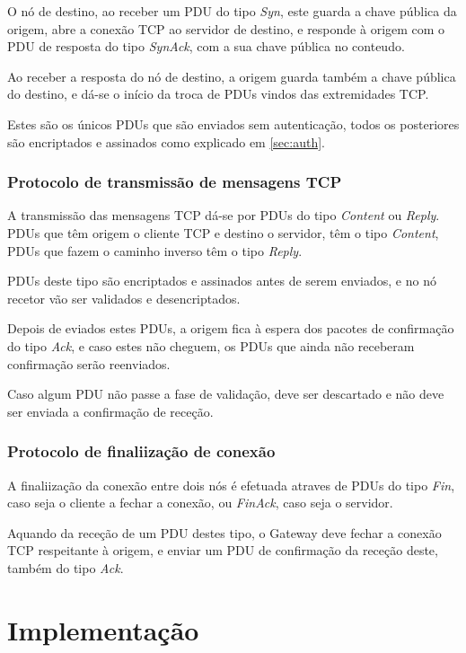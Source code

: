 \documentclass[a4paper]{report}
\begin{document}
O nó de destino, ao receber um PDU do tipo \textit{Syn}, este guarda
a chave pública da origem, abre a conexão TCP ao servidor de destino, e
responde à origem com o PDU de resposta do tipo \textit{SynAck}, com a sua
chave pública no conteudo.

Ao receber a resposta do nó de destino, a origem guarda também a chave
pública do destino, e dá-se o início da troca de PDUs vindos das 
extremidades TCP.

Estes são os únicos PDUs que são enviados sem autenticação, todos os
posteriores são encriptados e assinados como explicado em \ref{sec:auth}.

\subsection{Protocolo de transmissão de mensagens TCP}

A transmissão das mensagens TCP dá-se por PDUs do tipo \textit{Content} ou
\textit{Reply}. PDUs que têm origem o cliente TCP e destino o servidor,
têm o tipo \textit{Content}, PDUs que fazem o caminho inverso têm o tipo
\textit{Reply}.

PDUs deste tipo são encriptados e assinados antes de serem enviados, e no
nó recetor vão ser validados e desencriptados.

Depois de eviados estes PDUs, a origem fica à espera dos pacotes de confirmação
do tipo \textit{Ack}, e caso estes não cheguem, os PDUs que ainda não receberam
confirmação serão reenviados.

Caso algum PDU não passe a fase de validação, deve ser descartado e não deve
ser enviada a confirmação de receção.

\subsection{Protocolo de finaliização de conexão}

A finaliização da conexão entre dois nós é efetuada atraves de PDUs do tipo
\textit{Fin}, caso seja o cliente a fechar a conexão, ou \textit{FinAck},
caso seja o servidor.

Aquando da receção de um PDU destes tipo, o Gateway deve fechar a conexão TCP
respeitante à origem, e enviar um PDU de confirmação da receção deste, também
do tipo \textit{Ack}.

\chapter{Implementação}
\end{document}
